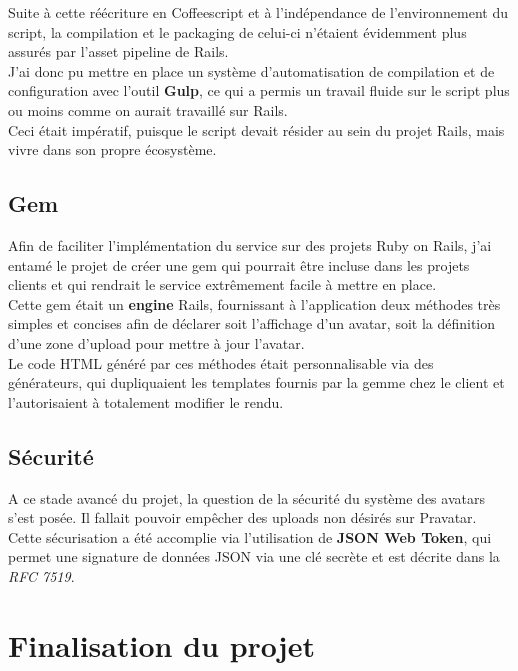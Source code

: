 \documentclass{report}
\begin{document}
      Suite à cette réécriture en Coffeescript et à l'indépendance de l'environnement du script, la compilation et le packaging de celui-ci n'étaient évidemment plus assurés par l'asset pipeline de Rails.\\
      J'ai donc pu mettre en place un système d'automatisation de compilation et de configuration avec l'outil \textbf{Gulp}, ce qui a permis un travail fluide sur le script
      plus ou moins comme on aurait travaillé sur Rails.\\
      Ceci était impératif, puisque le script devait résider au sein du projet Rails, mais vivre dans son propre écosystème.\\

    \subsection{Gem}
    \label{sub:Gem}

      Afin de faciliter l'implémentation du service sur des projets Ruby on Rails, j'ai entamé le projet de créer une gem qui pourrait être incluse dans les projets clients et qui rendrait le service
      extrêmement facile à mettre en place.\\

      Cette gem était un \textbf{engine} Rails, fournissant à l'application deux méthodes très simples et concises afin de déclarer soit l'affichage d'un avatar, soit la définition d'une zone d'upload pour
      mettre à jour l'avatar.\\
      Le code HTML généré par ces méthodes était personnalisable via des générateurs, qui dupliquaient les templates fournis par la gemme chez le client et l'autorisaient à totalement modifier le rendu.\\

    \subsection{Sécurité}
    \label{sub:Sécurité}

      A ce stade avancé du projet, la question de la sécurité du système des avatars s'est posée. Il fallait pouvoir empêcher des uploads non désirés sur Pravatar.\\
      Cette sécurisation a été accomplie via l'utilisation de \textbf{JSON Web Token}, qui permet une signature de données JSON via une clé secrète et est décrite dans la \textit{RFC 7519}.

  \section{Finalisation du projet}
  \label{sec:Finalisation du projet}
\end{document}
